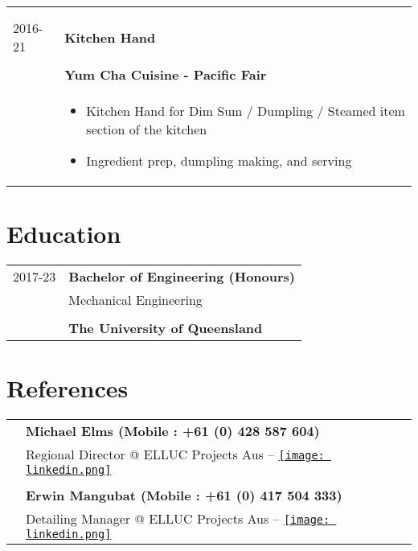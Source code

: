 \documentclass[10pt]{article}
\begin{document}
\begin{tabular}{ p{2cm}|p{15cm} }
\begin{itemize}
    \end{itemize} \\ \\
    2016-21 & \Large\textbf{Kitchen Hand} \\ \\ 
    & \large\textbf{Yum Cha Cuisine - Pacific Fair} \\
    & \begin{itemize}
        \setlength\itemsep{0pt}
        \item Kitchen Hand for Dim Sum / Dumpling / Steamed item section of the kitchen
        \item Ingredient prep, dumpling making, and serving
    \end{itemize} 
\end{tabular}

\section*{Education}
\begin{tabular}{ p{2cm}|p{17cm} } 
    \multirow{1}{*}{2017-23} & \huge\textbf{Bachelor of Engineering (Honours)} \\
    & \large{Mechanical Engineering} \\ \\
    & \large\textbf{The University of Queensland} \\
\end{tabular}

\section*{References}
\begin{tabular}{ p{2cm}|p{15cm} }
    & \textbf{Michael Elms (Mobile : +61 (0) 428 587 604)} \\
    &    \qquad Regional Director @ ELLUC Projects Aus -- 
        \href{https://au.linkedin.com/in/michaeltroyelms}{\texttt{[image: linkedin.png]}} \\ \\
    & \textbf{Erwin Mangubat (Mobile : +61 (0) 417 504 333)} \\
    &    \qquad Detailing Manager @ ELLUC Projects Aus -- 
        \href{https://au.linkedin.com/in/erwinmangubat}{\texttt{[image: linkedin.png]}} \\
\end{tabular}
\end{document}
